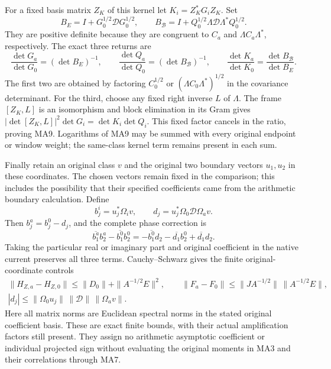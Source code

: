 \documentclass[11pt]{article}
\begin{document}
For a fixed basis matrix $Z_K$ of this kernel let
$K_i=Z_K^*G_iZ_K$. Set
\[
 B_E=I+G_0^{1/2}\mathcal D G_0^{1/2},\qquad
 B_{\mathcal B}=I+Q_0^{1/2}\Lambda\mathcal D\Lambda^*Q_0^{1/2}.
\]
They are positive definite because they are congruent to $C_a$
and $\Lambda C_a\Lambda^*$, respectively. The exact three returns are
\begin{equation}\tag{MA9}\boxed{
 \frac{\det G_a}{\det G_0}=(\det B_E)^{-1},\qquad
 \frac{\det Q_a}{\det Q_0}=(\det B_{\mathcal B})^{-1},\qquad
 \frac{\det K_a}{\det K_0}=\frac{\det B_{\mathcal B}}{\det B_E}.}
\end{equation}
The first two are obtained by factoring $C_0^{1/2}$ or
$(\Lambda C_0\Lambda^*)^{1/2}$ in the covariance determinant.
For the third, choose any fixed right inverse $L$ of $\Lambda$.
The frame $[Z_K,L]$ is an isomorphism and block elimination in its
Gram gives
$|\det[Z_K,L]|^2\det G_i=\det K_i\det Q_i$.
This fixed factor cancels in the ratio, proving MA9. Logarithms of
MA9 may be summed with every original endpoint or window weight;
the same-class kernel term remains present in each sum.

Finally retain an original class $v$ and the original two boundary
vectors $u_1,u_2$ in these coordinates. The chosen vectors remain
fixed in the comparison; this includes the possibility that their
specified coefficients came from the arithmetic boundary calculation.
Define
\[
 b_j^i=u_j^*\Omega_i v,\qquad
 d_j=u_j^*\Omega_0\mathcal D\Omega_a v.
 \tag{MA10}
\]
Then $b_j^a=b_j^0-d_j$, and the complete phase correction is
\begin{equation}\tag{MA11}\boxed{
 \overline{b_1^a}b_2^a-\overline{b_1^0}b_2^0
 =-\overline{b_1^0}d_2-\overline{d_1}b_2^0+\overline{d_1}d_2.}
\end{equation}
Taking the particular real or imaginary part and original coefficient
in the native current preserves all three terms. Cauchy--Schwarz gives
the finite original-coordinate controls
\begin{equation}\tag{MA12}\begin{gathered}
 \|H_{Z,a}-H_{Z,0}\|\le\|D_0\|+\|A^{-1/2}E\|^2,\qquad
 \|F_a-F_0\|\le\|JA^{-1/2}\|\,\|A^{-1/2}E\|,\\
 |d_j|\le\|\Omega_0u_j\|\,\|\mathcal D\|\,\|\Omega_av\|.
\end{gathered}\end{equation}
Here all matrix norms are Euclidean spectral norms in the stated
original coefficient basis. These are exact finite bounds, with their
actual amplification factors still present. They assign no arithmetic
asymptotic coefficient or individual projected sign without evaluating
the original moments in MA3 and their correlations through MA7.
\end{document}
